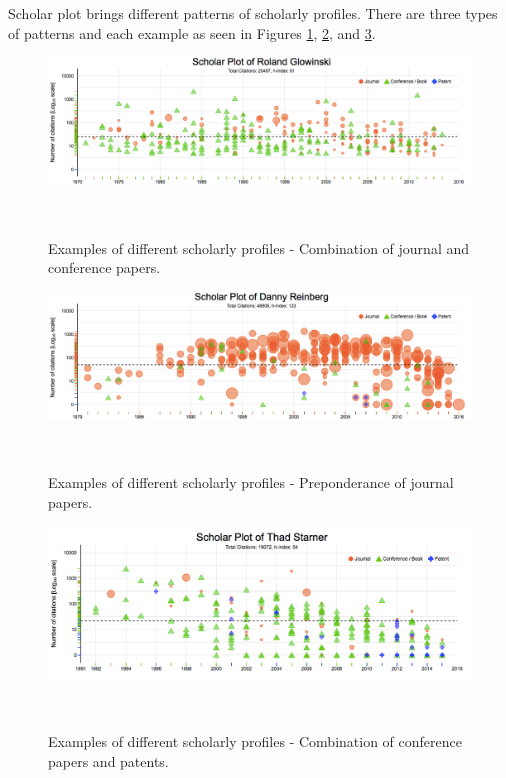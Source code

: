 

Scholar plot brings different patterns of scholarly profiles. There are three types of patterns and each example as seen in Figures \ref{fig-RolandGlowinski}, \ref{fig-DannyReinberg}, and \ref{fig-ThadStarner}.


\begin{figure}%
\centering
  \includegraphics[width=1\textwidth]{figures/fig-RolandGlowinski}
  \caption{Examples of different scholarly profiles - Combination of journal and conference papers.}~\label{fig-RolandGlowinski}
\end{figure}

\begin{figure}%
\centering
  \includegraphics[width=1\textwidth]{figures/fig-DannyReinberg}
  \caption{Examples of different scholarly profiles - Preponderance of journal papers.}~\label{fig-DannyReinberg}
\end{figure}

\begin{figure}%
\centering
  \includegraphics[width=1\textwidth]{figures/fig-ThadStarner}
  \caption{Examples of different scholarly profiles - Combination of conference papers and patents.}~\label{fig-ThadStarner}
\end{figure}






